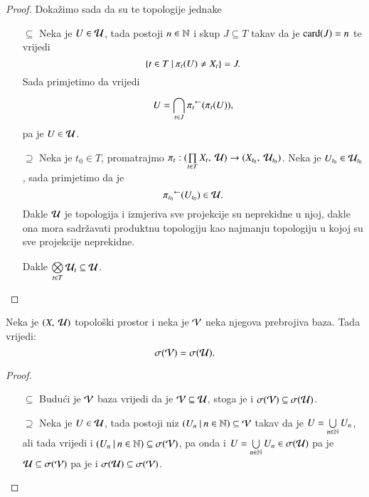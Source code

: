 \begin{proof}
    Doka\v zimo sada da su te topologije jednake
    \begin{enumerate}
        \item[$\subseteq$] Neka je $U \in \mathcal{U}$, tada postoji $n \in \mathbb{N}$ i skup $J \subseteq T$ takav da je $\textnormal{card}({J}) = n$ te vrijedi
        \begin{equation*}
            \{{t \in T} \: | \: {\pi_t(U) \neq X_t}\} = J.
        \end{equation*}
        Sada primjetimo da vrijedi
        \begin{equation*}
            U = \bigcap\limits_{t \in J}^{} {\pi_t}^{\leftarrow} (\pi_t (U)),
        \end{equation*}
        pa je $U \in \mathcal{U}$.
        \item[$\supseteq$]
        Neka je $t_0 \in T$, promatrajmo $\pi_t : ({\prod\limits_{t \in T}^{} X_t}, \: {\mathcal{U}}) \to ({X_{t_0}}, \: {\mathcal{U}_{t_0}})$.
        Neka je $U_{t_0} \in \mathcal{U}_{t_0}$, sada primjetimo da je
        \begin{equation*}
            {\pi_{t_0}}^{\leftarrow} (U_{t_0}) \in \mathcal{U}.
        \end{equation*}
        Dakle $\mathcal{U}$ je topologija i izmjeriva sve projekcije su neprekidne u njoj, dakle ona mora sadr\v zavati produktnu topologiju kao najmanju topologiju u kojoj su sve projekcije neprekidne.

        Dakle $\bigotimes\limits_{t \in T}^{} \mathcal{U}_t \subseteq \mathcal{U}$.
    \end{enumerate}
\end{proof}

\begin{tm}  \label{tm:4.0-3}
    Neka je $({X}, \: {\mathcal{U}})$ topolo\v ski prostor i neka je $\mathcal{V}$ neka njegova prebrojiva baza.
    Tada vrijedi:
    \begin{equation*}
        \sigma({\mathcal{V}}) = \sigma({\mathcal{U}}).
    \end{equation*}
\end{tm}

\begin{proof}
    \begin{enumerate}
        \item[$\subseteq$] Budu\' ci je $\mathcal{V}$ baza vrijedi da je $\mathcal{V} \subseteq \mathcal{U}$, stoga je i $\sigma({\mathcal{V}}) \subseteq \sigma({\mathcal{U}})$.
        \item[$\supseteq$] Neka je $U \in \mathcal{U}$, tada postoji niz $({U_n} \: | \: {n \in \mathbb{N}}) \subseteq \mathcal{V}$ takav da je $U = \bigcup\limits_{n \in \mathbb{N}}^{} U_n$, ali tada vrijedi i $({U_n} \: | \: {n \in \mathbb{N}}) \subseteq \sigma({\mathcal{V}})$, pa onda i $U = \bigcup\limits_{n \in \mathbb{N}}^{} U_n \in \sigma({\mathcal{U}})$ pa je $\mathcal{U} \subseteq \sigma({\mathcal{V}})$ pa je i $\sigma({\mathcal{U}}) \subseteq \sigma({\mathcal{V}})$.  
    \end{enumerate}
\end{proof}

